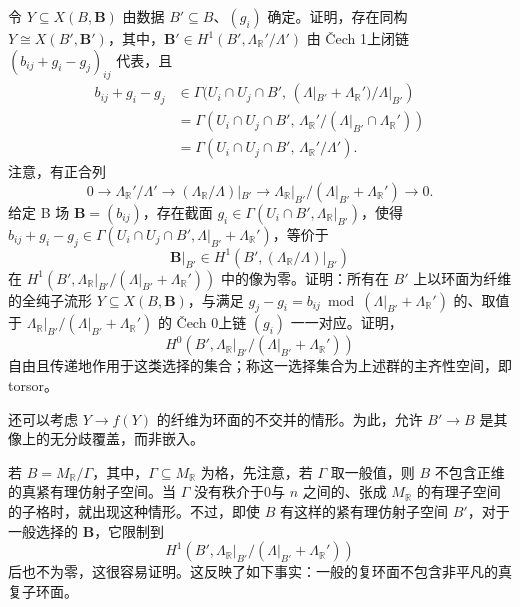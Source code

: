 \begin{exercise}\label{exer:6.55}
令 $Y\subseteq X(B,\mathbf B)$ 由数据 $B'\subseteq B$、$(g_i)$ 确定。证明，存在同构 $Y\cong X(B',\mathbf B')$，其中，$\mathbf B'\in H^1(B',\Lambda_{\mathbb R}'/\Lambda')$ 由 Čech 1上闭链 $(b_{ij}+g_i-g_j)_{ij}$ 代表，且
\[
\begin{aligned}
b_{ij}+g_i-g_j
&\in\Gamma(U_i\cap U_j\cap B',\,(
\Lambda|_{B'}+\Lambda_{\mathbb R}')/\Lambda|_{B'})\\
&=\Gamma(U_i\cap U_j\cap B',\,
\Lambda_{\mathbb R}'/(\Lambda|_{B'}\cap\Lambda_{\mathbb R}'))\\
&=\Gamma(U_i\cap U_j\cap B',\,\Lambda_{\mathbb R}'/\Lambda').
\end{aligned}
\]
注意，有正合列
\begin{equation}\label{eq:6.3}
0\longrightarrow\Lambda_{\mathbb R}'/\Lambda'
\longrightarrow(\Lambda_{\mathbb R}/\Lambda)|_{B'}
\longrightarrow\Lambda_{\mathbb R}|_{B'}/(\Lambda|_{B'}+\Lambda_{\mathbb R}')
\longrightarrow0.
\end{equation}
给定 B 场 $\mathbf B=(b_{ij})$，存在截面 $g_i\in\Gamma(U_i\cap B',\Lambda_{\mathbb R}|_{B'})$，使得 $b_{ij}+g_i-g_j\in\Gamma(U_i\cap U_j\cap B',\Lambda|_{B'}+\Lambda_{\mathbb R}')$，等价于
\[
\mathbf B|_{B'}\in H^1(B',(\Lambda_{\mathbb R}/\Lambda)|_{B'})
\]
在 $H^1(B',\Lambda_{\mathbb R}|_{B'}/(\Lambda|_{B'}+\Lambda_{\mathbb R}'))$ 中的像为零。证明：所有在 $B'$ 上以环面为纤维的全纯子流形 $Y\subseteq X(B,\mathbf B)$，与满足 $g_j-g_i=b_{ij}\bmod(\Lambda|_{B'}+\Lambda_{\mathbb R}')$ 的、取值于 $\Lambda_{\mathbb R}|_{B'}/(\Lambda|_{B'}+\Lambda_{\mathbb R}')$ 的 Čech 0上链 $(g_i)$ 一一对应。证明，
\[
H^0(B',\Lambda_{\mathbb R}|_{B'}/(\Lambda|_{B'}+\Lambda_{\mathbb R}'))
\]
自由且传递地作用于这类选择的集合；称这一选择集合为上述群的主齐性空间，即 torsor。\BookQED
\end{exercise}

\begin{note}[numbered]\label{note:6.56}
还可以考虑 $Y\to f(Y)$ 的纤维为环面的不交并的情形。为此，允许 $B'\to B$ 是其像上的无分歧覆盖，而非嵌入。
\end{note}

\begin{example}\label{ex:6.57}
若 $B=M_{\mathbb R}/\Gamma$，其中，$\Gamma\subseteq M_{\mathbb R}$ 为格，先注意，若 $\Gamma$ 取一般值，则 $B$ 不包含正维的真紧有理仿射子空间。当 $\Gamma$ 没有秩介于0与 $n$ 之间的、张成 $M_{\mathbb R}$ 的有理子空间的子格时，就出现这种情形。不过，即使 $B$ 有这样的紧有理仿射子空间 $B'$，对于一般选择的 $\mathbf B$，它限制到
\[
H^1(B',\Lambda_{\mathbb R}|_{B'}/(\Lambda|_{B'}+\Lambda_{\mathbb R}'))
\]
后也不为零，这很容易证明。这反映了如下事实：一般的复环面不包含非平凡的真复子环面。\BookQED
\end{example}

